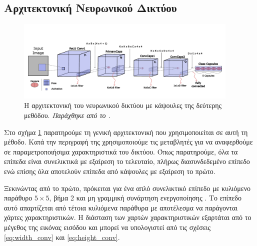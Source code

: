 \subsection{Αρχιτεκτονική Νευρωνικού Δικτύου}

\begin{figure}[h]
  \centering
  \includegraphics[width=0.95\textwidth]{images/chapter method/second_method_architecxture.pdf}
  \caption{Η αρχιτεκτονική του νευρωνικού δικτύου με κάψουλες της δεύτερης μεθόδου. \textit{Παράχθηκε από το \href{https://inkscape.org/}{}}.}
  \label{fig:method_2_architecture}
\end{figure}

Στο σχήμα \ref{fig:method_2_architecture} παρατηρούμε τη γενική αρχιτεκτονική που χρησιμοποιείται σε αυτή τη μέθοδο. Κατά την περιγραφή της χρησιμοποιούμε τις μεταβλητές  για να αναφερθούμε σε παραμετροποιήσιμα χαρακτηριστικά του δικτύου. Όπως παρατηρούμε, όλα τα επίπεδα είναι συνελικτικά με εξαίρεση το τελευταίο, πλήρως διασυνδεδεμένο επίπεδο ενώ επίσης όλα αποτελούν επίπεδα από κάψουλες με εξαίρεση το πρώτο.\par

Ξεκινώντας από το πρώτο, πρόκειται για ένα απλό συνελικτικό επίπεδο με κυλιόμενο παράθυρο $5 \times 5$, βήμα 2 και μη γραμμική συνάρτηση ενεργοποίησης . Το επίπεδο αυτό απαρτίζεται από  τέτοια κυλιόμενα παράθυρα με αποτέλεσμα να παράγονται  χάρτες χαρακτηριστικών. Η διάσταση των χαρτών χαρακτηριστικών εξαρτάται από το μέγεθος της εικόνας εισόδου και μπορεί να υπολογιστεί από τις σχέσεις \ref{eq:width_conv} και  \ref{eq:height_conv}.\par

